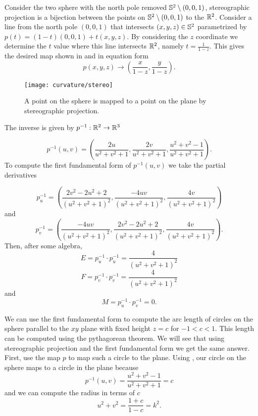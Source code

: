 \begin{example}\label{ex:stereo}
Consider the two sphere with the north pole removed $\mathbb{S}^2 \setminus (0,0,1)$,
stereographic projection is a bijection between the points on $\mathbb{S}^2 \setminus (0,0,1)$ to the $\mathbb{R}^2$.
Consider a line from the north pole $(0,0,1)$ that intersects $(x,y,z)\in \mathbb{S}^2$ parametrized by 
$p(t)=(1-t)(0,0,1)+t(x,y,z)$. By considering the $z$ coordinate we determine the $t$ value where this line
intersects $\mathbb{R}^2$, namely $t=\frac{1}{1-z}.$
This gives the desired map shown in  and in equation form
$$p(x,y,z)\to \left(\frac{x}{1-z},\frac{y}{1-z}\right).$$

\begin{figure}[htb]
	\centering
	\texttt{[image: curvature/stereo]}
	\caption{A point on the sphere is mapped to a point on the plane by stereographic projection.}
	\label{fig:stereo}
\end{figure}
	
The inverse is given by $p^{-1}:\mathbb{R}^2\to \mathbb{R}^3$

	\begin{equation}\label{eqn:stereo}
		p^{-1}(u,v)=\left(\frac{2u}{u^2+v^2+1},\frac{2v}{u^2+v^2+1},\frac{u^2+v^2-1}{u^2+v^2+1}\right).	
	\end{equation}
To compute the first fundamental form of $p^{-1}(u,v)$ we take the partial derivatives

$$p^{-1}_u=\left(\frac{2v^2-2u^2+2}{(u^2+v^2+1)^2},\frac{-4uv}{(u^2+v^2+1)^2},\frac{4v}{(u^2+v^2+1)^2}\right)$$
and 
$$p^{-1}_v=\left(\frac{-4uv}{(u^2+v^2+1)^2},\frac{2v^2-2u^2+2}{(u^2+v^2+1)^2},\frac{4v}{(u^2+v^2+1)^2}\right).$$
Then, after some algebra,
$$E=p^{-1}_u\cdot p^{-1}_u=\frac{4}{(u^2+v^2+1)^2}$$
$$F=p^{-1}_v\cdot p^{-1}_v=\frac{4}{(u^2+v^2+1)^2}$$
and
$$M=p^{-1}_u\cdot p^{-1}_v=0.$$

We can use the first fundamental form to compute
the  arc length of circles on the sphere parallel to the $xy$ plane with fixed height $z=c$ for $-1<c<1$.
This length can be computed using
the pythagorean theorem. We will see that using stereographic projection
and the first fundamental form we get the same answer.
First, use the map $p$ to map such a circle to the plane.
Using , our circle on the sphere maps 
to a circle in the plane because
	$$p^{-1}(u,v)=\frac{u^2+v^2-1}{u^2+v^2+1}=c$$
and we can compute the radius in terms of $c$
\begin{equation}\label{eqn:radius}
	u^2+v^2=\frac{1+c}{1-c}=k^2.
\end{equation}
	

\end{example}
